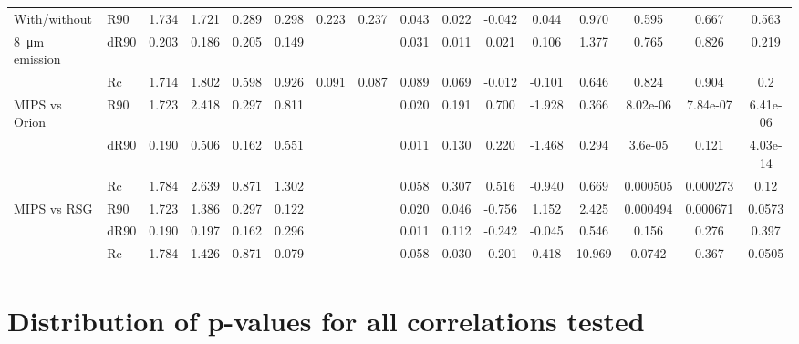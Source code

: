 \begin{landscape}
\begin{table}
\begin{tabular}{llSSSSSSSSSSSSSS}
With/without  & R90 & 1.734 & 1.721 & 0.289 & 0.298 & 0.223 & 0.237 & 0.043 & 0.022 & -0.042 & 0.044 & 0.970 & 0.595 & 0.667 & 0.563\\
\SI{8}{\um} emission & dR90 & 0.203 & 0.186 & 0.205 & 0.149 &  &  & 0.031 & 0.011 & 0.021 & 0.106 & 1.377 & 0.765 & 0.826 & 0.219\\
 & Rc & 1.714 & 1.802 & 0.598 & 0.926 & 0.091 & 0.087 & 0.089 & 0.069 & -0.012 & -0.101 & 0.646 & 0.824 & 0.904 & 0.2\\
\midrule
MIPS vs Orion & R90 & 1.723 & 2.418 & 0.297 & 0.811 &  &  & 0.020 & 0.191 & 0.700 & -1.928 & 0.366 & 8.02e-06 & 7.84e-07 & 6.41e-06\\
 & dR90 & 0.190 & 0.506 & 0.162 & 0.551 &  &  & 0.011 & 0.130 & 0.220 & -1.468 & 0.294 & 3.6e-05 & 0.121 & 4.03e-14\\
 & Rc & 1.784 & 2.639 & 0.871 & 1.302 &  &  & 0.058 & 0.307 & 0.516 & -0.940 & 0.669 & 0.000505 & 0.000273 & 0.12\\
MIPS vs RSG & R90 & 1.723 & 1.386 & 0.297 & 0.122 &  &  & 0.020 & 0.046 & -0.756 & 1.152 & 2.425 & 0.000494 & 0.000671 & 0.0573\\
 & dR90 & 0.190 & 0.197 & 0.162 & 0.296 &  &  & 0.011 & 0.112 & -0.242 & -0.045 & 0.546 & 0.156 & 0.276 & 0.397\\
 & Rc & 1.784 & 1.426 & 0.871 & 0.079 &  &  & 0.058 & 0.030 & -0.201 & 0.418 & 10.969 & 0.0742 & 0.367 & 0.0505\\
\bottomrule
\end{tabular}
\end{table}
\end{landscape}

\section{Distribution of p-values for all correlations tested}
\label{sec:distr-p-values}

